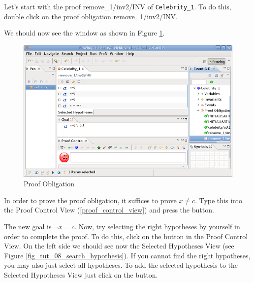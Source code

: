 Let's start with the proof \textsf{remove\_1/inv2/INV} of \texttt{Celebrity\_1}. To do this, double click on the proof obligation \textsf{remove\_1/inv2/INV}.


We should now see the window as shown in Figure \ref{fig_tut_08_proof_obligation}.

\begin{figure}[!h]
\begin{center}
	\includegraphics{img/tutorial/tut_08_proof2.png}
	\caption{Proof Obligation}
	\label{fig_tut_08_proof_obligation}
\end{center}
\end{figure}


In order to prove the proof obligation, it suffices to prove \textsf{$x \neq c$}. Type this into the \textsf{Proof Control View} (\ref{proof_control_view}) and press the \textsf{ button}. 


The new goal is $\lnot x = c$. Now, try selecting the right hypotheses by yourself in order to complete the proof. To do this, click on the  button in the \textsf{Proof Control View}. On the left side we should see now the \textsf{Selected Hypotheses View} (see Figure \ref{fig_tut_08_search_hypothesis}). If you cannot find the right hypotheses, you may also just select all hypotheses. To add the selected hypothesis to the \textsf{Selected Hypotheses View} just click on the  button. 

